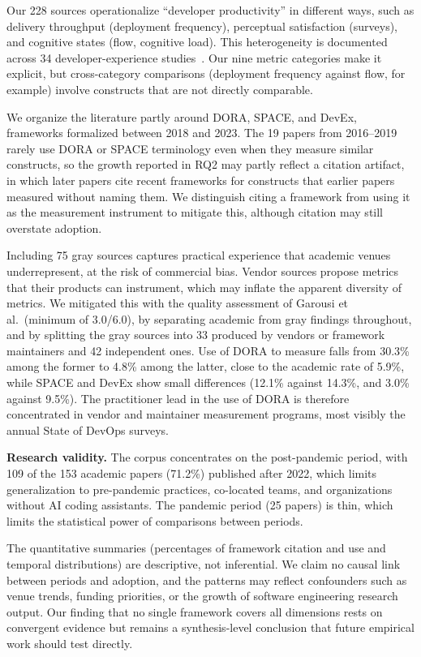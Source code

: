 \documentclass[preprint,number]{elsarticle}
\begin{document}
Our 228 sources operationalize ``developer productivity'' in different ways, such as delivery throughput (deployment frequency), perceptual satisfaction (surveys), and cognitive states (flow, cognitive load). This heterogeneity is documented across 34 developer-experience studies~\cite{P0476}. Our nine metric categories make it explicit, but cross-category comparisons (deployment frequency against flow, for example) involve constructs that are not directly comparable.

We organize the literature partly around DORA, SPACE, and DevEx, frameworks formalized between 2018 and 2023. The 19 papers from 2016--2019 rarely use DORA or SPACE terminology even when they measure similar constructs, so the growth reported in RQ2 may partly reflect a citation artifact, in which later papers cite recent frameworks for constructs that earlier papers measured without naming them. We distinguish citing a framework from using it as the measurement instrument to mitigate this, although citation may still overstate adoption.

Including 75 gray sources captures practical experience that academic venues underrepresent, at the risk of commercial bias. Vendor sources propose metrics that their products can instrument, which may inflate the apparent diversity of metrics. We mitigated this with the quality assessment of Garousi et al.\ (minimum of 3.0/6.0), by separating academic from gray findings throughout, and by splitting the gray sources into 33 produced by vendors or framework maintainers and 42 independent ones. Use of DORA to measure falls from 30.3\% among the former to 4.8\% among the latter, close to the academic rate of 5.9\%, while SPACE and DevEx show small differences (12.1\% against 14.3\%, and 3.0\% against 9.5\%). The practitioner lead in the use of DORA is therefore concentrated in vendor and maintainer measurement programs, most visibly the annual State of DevOps surveys.

\textbf{Research validity.}
The corpus concentrates on the post-pandemic period, with 109 of the 153 academic papers (71.2\%) published after 2022, which limits generalization to pre-pandemic practices, co-located teams, and organizations without AI coding assistants. The pandemic period (25 papers) is thin, which limits the statistical power of comparisons between periods.

The quantitative summaries (percentages of framework citation and use and temporal distributions) are descriptive, not inferential. We claim no causal link between periods and adoption, and the patterns may reflect confounders such as venue trends, funding priorities, or the growth of software engineering research output. Our finding that no single framework covers all dimensions rests on convergent evidence but remains a synthesis-level conclusion that future empirical work should test directly.
\end{document}
